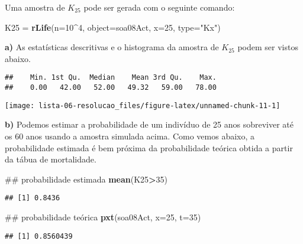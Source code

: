 \documentclass[]{article}
\newenvironment{Shaded}{\begin{snugshade}}{\end{snugshade}}
\newcommand{\DataTypeTok}[1]{\textcolor[rgb]{0.13,0.29,0.53}{#1}}
\newcommand{\DecValTok}[1]{\textcolor[rgb]{0.00,0.00,0.81}{#1}}
\newcommand{\KeywordTok}[1]{\textcolor[rgb]{0.13,0.29,0.53}{\textbf{#1}}}
\newcommand{\NormalTok}[1]{#1}
\newcommand{\OperatorTok}[1]{\textcolor[rgb]{0.81,0.36,0.00}{\textbf{#1}}}
\newcommand{\StringTok}[1]{\textcolor[rgb]{0.31,0.60,0.02}{#1}}
\begin{document}
Uma amostra de \(K_{25}\) pode ser gerada com o seguinte comando:

\begin{Shaded}
\begin{Highlighting}[]
\NormalTok{K25 =}\StringTok{ }\KeywordTok{rLife}\NormalTok{(}\DataTypeTok{n=}\DecValTok{10}\OperatorTok{^}\DecValTok{4}\NormalTok{, }\DataTypeTok{object=}\NormalTok{soa08Act, }\DataTypeTok{x=}\DecValTok{25}\NormalTok{, }\DataTypeTok{type=}\StringTok{"Kx"}\NormalTok{)}
\end{Highlighting}
\end{Shaded}

\textbf{a)} As estatísticas descritivas e o histograma da amostra de
\(K_{25}\) podem ser vistos abaixo.

\begin{verbatim}
##    Min. 1st Qu.  Median    Mean 3rd Qu.    Max. 
##    0.00   42.00   52.00   49.32   59.00   78.00
\end{verbatim}

\begin{center}\texttt{[image: lista-06-resolucao\_files/figure-latex/unnamed-chunk-11-1]} \end{center}

\textbf{b)} Podemos estimar a probabilidade de um indivíduo de 25 anos
sobreviver até os 60 anos usando a amostra simulada acima. Como vemos
abaixo, a probabilidade estimada é bem próxima da probabilidade teórica
obtida a partir da tábua de mortalidade.

\begin{Shaded}
\begin{Highlighting}[]
\NormalTok{## probabilidade estimada}
\KeywordTok{mean}\NormalTok{(K25}\OperatorTok{>}\DecValTok{35}\NormalTok{)}
\end{Highlighting}
\end{Shaded}

\begin{verbatim}
## [1] 0.8436
\end{verbatim}

\begin{Shaded}
\begin{Highlighting}[]
\NormalTok{## probabilidade teórica}
\KeywordTok{pxt}\NormalTok{(soa08Act, }\DataTypeTok{x=}\DecValTok{25}\NormalTok{, }\DataTypeTok{t=}\DecValTok{35}\NormalTok{)}
\end{Highlighting}
\end{Shaded}

\begin{verbatim}
## [1] 0.8560439
\end{verbatim}
\end{document}
